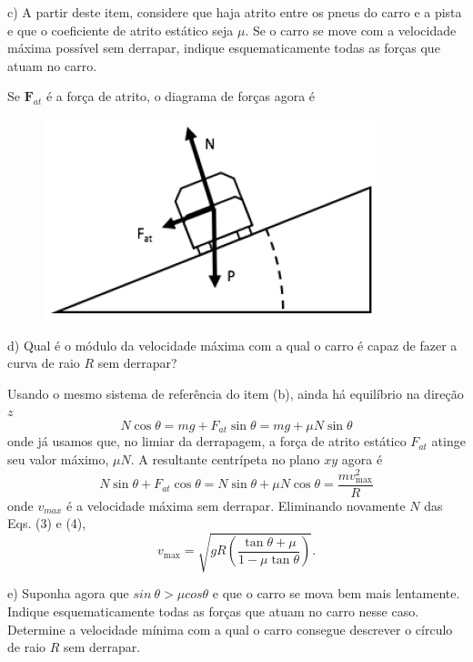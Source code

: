 \begin{enumerate}[start=1,label={\bfseries Q\arabic*.}]
c) A partir deste item, considere que haja atrito entre os pneus do carro e a pista e que o coeficiente de atrito estático seja $\mu$. Se o carro se move com a velocidade máxima possível sem derrapar, indique esquematicamente todas as forças que atuam no carro.

\resposta Se $\mathbf{F}_{at}$ é a força de atrito, o diagrama de forças agora é
\begin{figure}[H]
\centering
\includegraphics[scale=0.8]{classica-img/inclina2}
\end{figure}



d) Qual é o módulo da velocidade máxima com a qual o carro é capaz de fazer a curva de raio $R$ sem derrapar?

\resposta Usando o mesmo sistema de referência do item (b), ainda há equilíbrio na direção $z$
$$
N \cos \theta=m g+F_{a t} \sin \theta=m g+\mu N \sin \theta
$$
onde já usamos que, no limiar da derrapagem, a força de atrito estático $F_{at}$ atinge seu valor máximo, $\mu N$. A resultante centrípeta no plano $xy$ agora é
$$
N \sin \theta+F_{a t} \cos \theta=N \sin \theta+\mu N \cos \theta=\frac{m v_{\max }^{2}}{R}
$$
onde $v_{max}$ é a velocidade máxima sem derrapar. Eliminando novamente $N$ das Eqs. (3) e (4),
$$
v_{\max }=\sqrt{g R\left(\frac{\tan \theta+\mu}{1-\mu \tan \theta}\right)}.
$$

e) Suponha agora que $sin \ \theta > \mu cos \theta$ e que o carro se mova bem mais lentamente. Indique esquematicamente todas as forças que atuam no carro nesse caso. Determine a velocidade mínima com a qual o carro consegue descrever o círculo de raio $R$ sem derrapar.


\end{enumerate}
